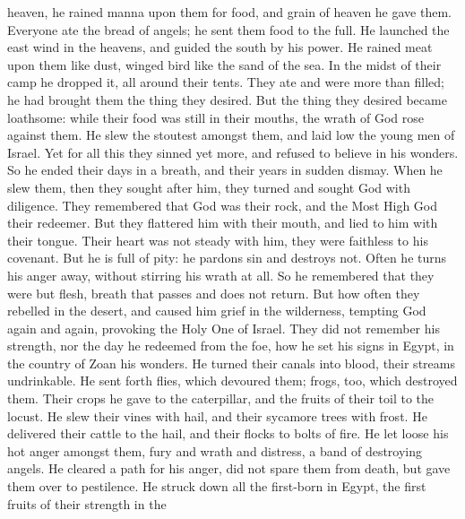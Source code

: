 heaven,  he rained manna upon them for food, and grain of
heaven he gave them.  Everyone ate the bread of angels; he
sent them food to the full.  He launched the east wind in
the heavens, and guided the south by his power.  He rained
meat upon them like dust, winged bird like the sand of the sea.
 In the midst of their camp he dropped it, all around their
tents.  They ate and were more than filled; he had brought
them the thing they desired.  But the thing they desired
became loathsome: while their food was still in their mouths,
 the wrath of God rose against them. He slew the stoutest
amongst them, and laid low the young men of Israel.  Yet
for all this they sinned yet more, and refused to believe in his
wonders.  So he ended their days in a breath, and their
years in sudden dismay.  When he slew them, then they
sought after him, they turned and sought God with diligence.
 They remembered that God was their rock, and the Most High
God their redeemer.  But they flattered him with their
mouth, and lied to him with their tongue.  Their heart was
not steady with him, they were faithless to his covenant. 
But he is full of pity: he pardons sin and destroys not. Often he turns
his anger away, without stirring his wrath at all.  So he
remembered that they were but flesh, breath that passes and does not
return.  But how often they rebelled in the desert, and
caused him grief in the wilderness,  tempting God again and
again, provoking the Holy One of Israel.  They did not
remember his strength, nor the day he redeemed from the foe,
 how he set his signs in Egypt, in the country of Zoan his
wonders.  He turned their canals into blood, their streams
undrinkable.  He sent forth flies, which devoured them;
frogs, too, which destroyed them.  Their crops he gave to
the caterpillar, and the fruits of their toil to the locust.
 He slew their vines with hail, and their sycamore trees
with frost.  He delivered their cattle to the hail, and
their flocks to bolts of fire.  He let loose his hot anger
amongst them, fury and wrath and distress, a band of destroying angels.
 He cleared a path for his anger, did not spare them from
death, but gave them over to pestilence.  He struck down
all the first-born in Egypt, the first fruits of their strength in the
